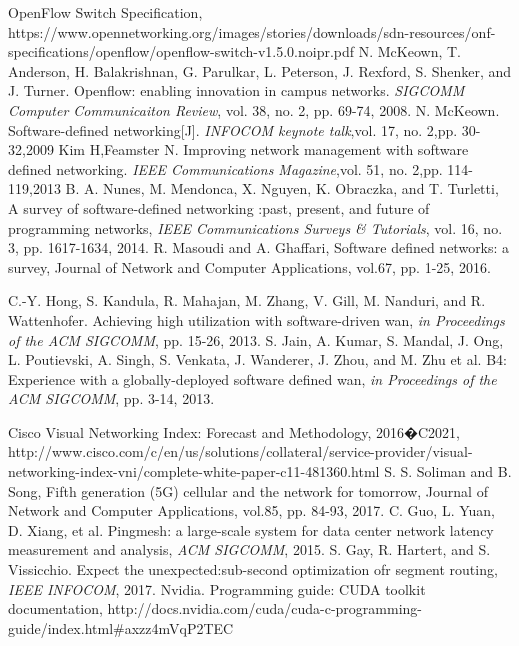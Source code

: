 \documentclass[master]{thesis-uestc}
\begin{document}
\begin{thebibliography}{1}
OpenFlow Switch Specification, https://www.opennetworking.org/images\newline/stories/downloads/sdn-resources/onf-specifications/openflow/openflow-switch-v1.5.0.noipr.pdf
N. McKeown, T. Anderson, H. Balakrishnan, G. Parulkar, L. Peterson, J. Rexford, S. Shenker, and J. Turner. Openflow: enabling innovation in campus networks. \emph{SIGCOMM Computer Communicaiton Review}, vol. 38, no. 2, pp. 69-74, 2008.
N. McKeown. Software-defined networking[J]. \emph{INFOCOM keynote talk},vol. 17, no. 2,pp. 30-32,2009
Kim H,Feamster N. Improving network management with software defined networking. \emph{IEEE Communications Magazine},vol. 51, no. 2,pp. 114-119,2013
B. A. Nunes, M. Mendonca, X. Nguyen, K. Obraczka, and T. Turletti,  A survey of software-defined networking :past, present, and future of programming networks, \emph{IEEE Communications Surveys \& Tutorials}, vol. 16, no. 3, pp. 1617-1634, 2014.
R. Masoudi and A. Ghaffari, Software defined networks: a survey, Journal of Network and Computer Applications, vol.67, pp. 1-25, 2016.


C.-Y. Hong, S. Kandula, R. Mahajan, M. Zhang, V. Gill, M. Nanduri, and R. Wattenhofer. Achieving high utilization with software-driven wan, \emph{in Proceedings of the ACM SIGCOMM}, pp. 15-26, 2013.
S. Jain, A. Kumar, S. Mandal, J. Ong, L. Poutievski, A. Singh, S. Venkata, J. Wanderer, J. Zhou, and M. Zhu et al. B4: Experience with a globally-deployed software defined wan, \emph{in Proceedings of the ACM SIGCOMM}, pp. 3-14, 2013.

Cisco Visual Networking Index: Forecast and Methodology, 2016�C2021, http://www.cisco.com/c/en/us/solutions/collateral/service-provider/visual-networking-index-vni/complete-white-paper-c11-481360.html
S. S. Soliman and B. Song, Fifth generation (5G) cellular and the network for tomorrow, Journal of Network and Computer Applications, vol.85, pp. 84-93, 2017.
C. Guo, L. Yuan, D. Xiang, et al. Pingmesh: a large-scale system for data center network latency measurement and analysis, \emph{ACM SIGCOMM}, 2015.
S. Gay, R. Hartert, and S. Vissicchio. Expect the unexpected:sub-second optimization ofr segment routing, \emph{IEEE INFOCOM}, 2017.
Nvidia. Programming guide: CUDA toolkit documentation, http://docs.nvidia.com/cuda/cuda-c-programming-guide/index.html\#axzz4mVqP2TEC


\end{thebibliography}
\end{document}
